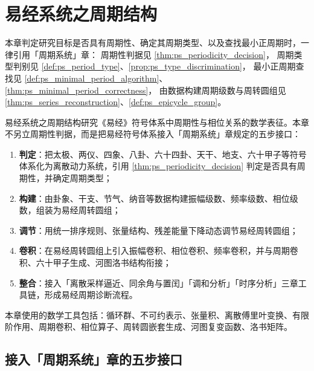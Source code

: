 \chapter{易经系统之周期结构}
\label{chap:yijing-periodic}

\begin{remark}[本章目标的周期性判定（引用）]\label{rem:yijing_ps_hook}
本章判定研究目标是否具有周期性、确定其周期类型、以及查找最小正周期时，一律引用「周期系统」章：
周期性判据见 \cref{thm:ps_periodicity_decision}，
周期类型判别见 \cref{def:ps_period_type}、\cref{prop:ps_type_discrimination}，
最小正周期查找见 \cref{def:ps_minimal_period_algorithm}、\cref{thm:ps_minimal_period_correctness}，
由数据构建周期级数与周转圆组见 \cref{thm:ps_series_reconstruction}、\cref{def:ps_epicycle_group}。
\end{remark}

\begin{remark}\label{rem:yijing_five_steps_positioning}
易经系统之周期结构研究《易经》符号体系中周期性与相位关系的数学表征。本章不另立周期性判据，而是把易经符号体系接入「周期系统」章规定的五步接口：
\begin{enumerate}[label=(\arabic*)]
    \item \textbf{判定}：把太极、两仪、四象、八卦、六十四卦、天干、地支、六十甲子等符号体系化为离散动力系统，引用 \cref{thm:ps_periodicity_decision} 判定是否具有周期性，并确定周期类型；
    \item \textbf{构建}：由卦象、干支、节气、纳音等数据构建振幅级数、频率级数、相位级数，组装为易经周转圆组；
    \item \textbf{调节}：用统一排序规则、张量结构、残差能量下降动态调节易经周转圆组；
    \item \textbf{卷积}：在易经周转圆组上引入振幅卷积、相位卷积、频率卷积，并与周期卷积、六十甲子生成、河图洛书结构衔接；
    \item \textbf{整合}：接入「离散采样逼近、同余角与置闰」「调和分析」「时序分析」三章工具链，形成易经周期诊断流程。
\end{enumerate}
本章使用的数学工具包括：循环群、不可约表示、张量积、离散傅里叶变换、有限阶作用、周期卷积、相位算子、周转圆嵌套生成、河图复变函数、洛书矩阵。
\end{remark}

\section{接入「周期系统」章的五步接口}
\label{sec:yijing_five_steps}

